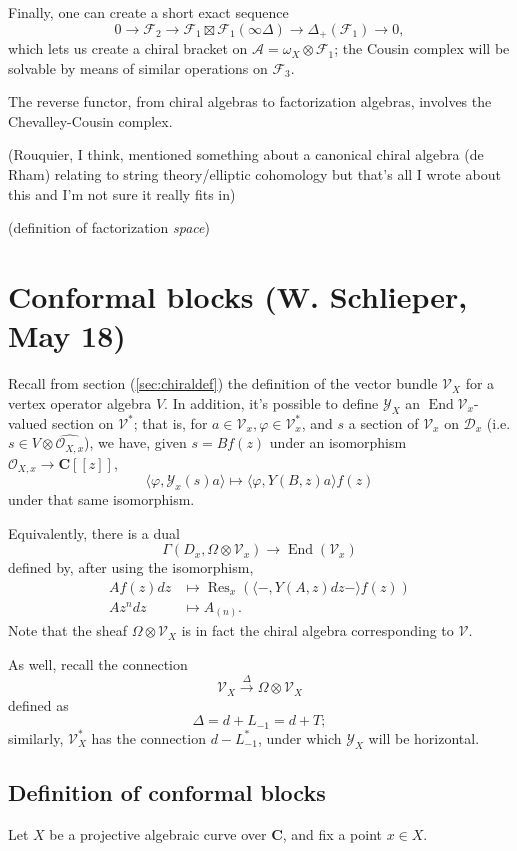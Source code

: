 \documentclass{article}
\newcommand{\CC}{\mathbold{C}}
\newcommand{\Oo}{\mathcal{O}}
\newcommand{\Dd}{\mathcal{D}}
\newcommand{\Aa}{\mathcal{A}}
\newcommand{\Ff}{\mathcal{F}}
\newcommand{\Vv}{\mathcal{V}}
\newcommand{\Yy}{\mathcal{Y}}
\DeclareMathOperator{\Res}{Res}
\DeclareMathOperator{\End}{End}
\begin{document}
Finally, one can create a short exact sequence
\[0 \rightarrow \Ff_2 \rightarrow \Ff_1 \boxtimes \Ff_1 (\infty \Delta) \rightarrow \Delta_+(\Ff_1) \rightarrow 0, \]
which lets us create a chiral bracket on $\Aa = \omega_X \otimes \Ff_1$; the Cousin complex will be solvable by means of similar operations on $\Ff_3$.

The reverse functor, from chiral algebras to factorization algebras, involves the Chevalley-Cousin complex.

(Rouquier, I think, mentioned something about a canonical chiral algebra (de Rham) relating to string theory/elliptic cohomology but that's all I wrote about this and I'm not sure it really fits in)

(definition of factorization \textit{space})

\section{Conformal blocks (W. Schlieper, May 18)}
Recall from section (\ref{sec:chiraldef}) the definition of the vector bundle $\Vv_X$ for a vertex operator algebra $V$.  In addition, it's possible to define $\Yy_X$ an $\End{\Vv_x}$-valued section on $\Vv^*$; that is, for $a \in \Vv_x, \varphi \in \Vv^*_x$, and $s$ a section of $\Vv_x$ on $\Dd_x$ (i.e. $s \in V \otimes \widehat{\Oo_{X,x}}$), we have, given $s=Bf(z)$ under an isomorphism $\Oo_{X,x}\rightarrow \CC[[z]]$,
\[\langle \varphi,\Yy_x(s)a \rangle \mapsto \langle \varphi,Y(B,z)a \rangle f(z) \]
under that same isomorphism.

Equivalently, there is a dual 
\[\Gamma(D_x,\Omega \otimes \Vv_x) \rightarrow \End(\Vv_x) \]
defined by, after using the isomorphism,
\begin{align}
  A f(z) dz &\mapsto \Res_x(\langle -,Y(A,z)dz - \rangle f(z))\\
  Az^n dz &\mapsto A_{(n)}.
\end{align}
Note that the sheaf $\Omega \otimes \Vv_X$ is in fact the chiral algebra corresponding to $\Vv$.

As well, recall the connection
\[\Vv_X \overset{\Delta}{\rightarrow} \Omega \otimes \Vv_X \]
defined as
\[\Delta = d+L_{-1}=d+T; \]
similarly, $\Vv^*_X$ has the connection $d-L^*_{-1}$, under which $\Yy_X$ will be horizontal.

\subsection{Definition of conformal blocks}
Let $X$ be a projective algebraic curve over $\CC$, and fix a point $x \in X$.
\end{document}
